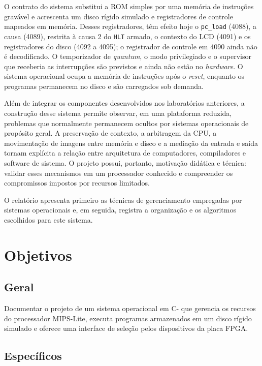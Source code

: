\documentclass[
    12pt,
    openright,
    a4paper,
    english,
    brazilian
]{abntex2}
\begin{document}
O contrato do sistema substitui a ROM simples por uma memória de instruções gravável e acrescenta um disco rígido simulado e registradores de controle mapeados em memória. Desses registradores, têm efeito hoje o \texttt{pc\_load} (4088), a causa (4089), restrita à causa 2 do \texttt{HLT} armado, o contexto do LCD (4091) e os registradores do disco (4092 a 4095); o registrador de controle em 4090 ainda não é decodificado. O temporizador de \emph{quantum}, o modo privilegiado e o supervisor que receberia as interrupções são previstos e ainda não estão no \emph{hardware}. O sistema operacional ocupa a memória de instruções após o \emph{reset}, enquanto os programas permanecem no disco e são carregados sob demanda.

Além de integrar os componentes desenvolvidos nos laboratórios anteriores, a construção desse sistema permite observar, em uma plataforma reduzida, problemas que normalmente permanecem ocultos por sistemas operacionais de propósito geral. A preservação de contexto, a arbitragem da CPU, a movimentação de imagens entre memória e disco e a mediação da entrada e saída tornam explícita a relação entre arquitetura de computadores, compiladores e software de sistema. O projeto possui, portanto, motivação didática e técnica: validar esses mecanismos em um processador conhecido e compreender os compromissos impostos por recursos limitados.

O relatório apresenta primeiro as técnicas de gerenciamento empregadas por sistemas operacionais e, em seguida, registra a organização e os algoritmos escolhidos para este sistema.

\chapter[Objetivos]{Objetivos}

\section{Geral}

Documentar o projeto de um sistema operacional em C- que gerencia os recursos do processador MIPS-Lite, executa programas armazenados em um disco rígido simulado e oferece uma interface de seleção pelos dispositivos da placa FPGA.

\section{Específicos}
\end{document}
